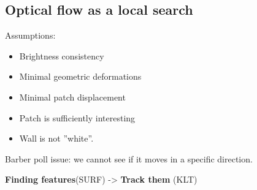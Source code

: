 \subsection*{Optical flow as a local search}
Assumptions:
\begin{itemize}
  \item Brightness consistency
  \item Minimal geometric deformations
  \item Minimal patch displacement
  \item Patch is sufficiently interesting
  \item Wall is not ''white''.
\end{itemize}
Barber poll issue: we cannot see if it moves in a specific direction.

\textbf{Finding features}(SURF) -> \textbf{Track them} (KLT)
